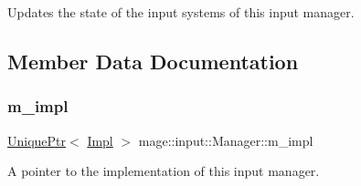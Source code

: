 Updates the state of the input systems of this input manager. 

\subsection{Member Data Documentation}
\hypertarget{classmage_1_1input_1_1_manager_ae404d608b787f264c0d5e8cf24aacf98}{}\label{classmage_1_1input_1_1_manager_ae404d608b787f264c0d5e8cf24aacf98} 
\subsubsection{\texorpdfstring{m\+\_\+impl}{m\_impl}}
{\footnotesize\ttfamily \hyperlink{namespacemage_a3316d7143a973e37adf1110f2e80ca31}{Unique\+Ptr}$<$ \hyperlink{classmage_1_1input_1_1_manager_1_1_impl}{Impl} $>$ mage\+::input\+::\+Manager\+::m\+\_\+impl\hspace{0.3cm}{\ttfamily [private]}}

A pointer to the implementation of this input manager. 
